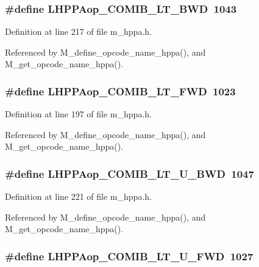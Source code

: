 \subsubsection{\setlength{\rightskip}{0pt plus 5cm}\#define LHPPAop\_\-COMIB\_\-LT\_\-BWD~1043}\label{m__hppa_8h_c8563dec3597a61d41b70577ae7541d8}




Definition at line 217 of file m\_\-hppa.h.

Referenced by M\_\-define\_\-opcode\_\-name\_\-hppa(), and M\_\-get\_\-opcode\_\-name\_\-hppa().
\subsubsection{\setlength{\rightskip}{0pt plus 5cm}\#define LHPPAop\_\-COMIB\_\-LT\_\-FWD~1023}\label{m__hppa_8h_74dbd58f335e842574a2eb4891011208}




Definition at line 197 of file m\_\-hppa.h.

Referenced by M\_\-define\_\-opcode\_\-name\_\-hppa(), and M\_\-get\_\-opcode\_\-name\_\-hppa().
\subsubsection{\setlength{\rightskip}{0pt plus 5cm}\#define LHPPAop\_\-COMIB\_\-LT\_\-U\_\-BWD~1047}\label{m__hppa_8h_7f6e3cef8dd164254d63689c058b9d71}




Definition at line 221 of file m\_\-hppa.h.

Referenced by M\_\-define\_\-opcode\_\-name\_\-hppa(), and M\_\-get\_\-opcode\_\-name\_\-hppa().
\subsubsection{\setlength{\rightskip}{0pt plus 5cm}\#define LHPPAop\_\-COMIB\_\-LT\_\-U\_\-FWD~1027}\label{m__hppa_8h_8550a31caf3d1c804550b290f144330f}




